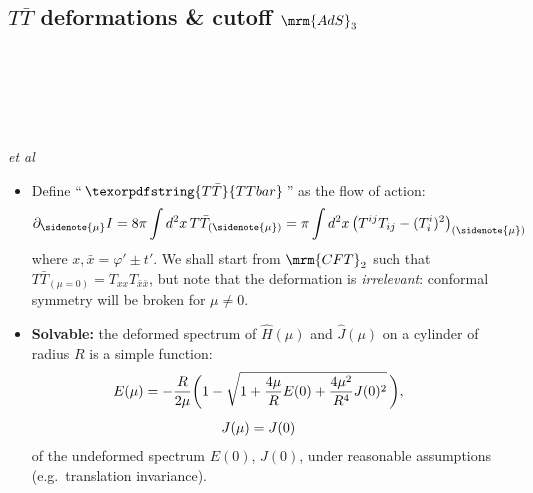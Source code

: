 \documentclass[10pt]{article}
\newcommand{\citations}[1]{{\footnotesize#1\par}}
\newcommand{\TTbar}{\texorpdfstring{\ensuremath{T\bar{T}}}{TTbar}\xspace}
\begin{document}
\begin{multicols}{3}

%
%	





\subsection*{\TTbar deformations \& cutoff $\mrm{AdS}_3$}

\citations{
\textcite{Zamolodchikov:2004ce}\\
\textcite{Dubovsky:2012wk}\\
\textcite{Dubovsky:2013ira}\\
\textcite{Smirnov:2016lqw}\\
\textcite{Cavaglia:2016oda}\\
\textcite{Dubovsky:2017cnj} \textit{et al}
}

\begin{itemize}

\item Define ``\,$\TTbar$\,'' as the flow of action:
\begin{equation}
	\partial_{\sidenote{\mu}} I = {8 \pi} \int d^2x \, T\bar T_{(\sidenote{\mu})} = {\pi} \int d^2x\,\big( T^{ij}T_{ij}- (T^i_i)^2 \big)_{(\sidenote{\mu})}
	\label{TTbardef}
\end{equation}
where $x, \bar{x} = \varphi' \pm t'$.
We shall start from $\mrm{CFT}_2$ such that $T\bar{T}_{(\mu = 0)} = T_{xx} T_{\bar{x}\bar{x}}$, but note that the deformation is \textit{irrelevant}: conformal symmetry will be broken for $\mu \ne 0$.

\item \textbf{Solvable:} the deformed spectrum of $\hat{H}(\mu)$ and $\hat{J}(\mu)$ on a cylinder of radius $R$ is a simple function:
\begin{equation}
\hspace{-2em}
\begin{gathered}
	E(\mu) = - \frac{R }{ 2\mu } \bigg(1-\sqrt{1 + \frac{4\mu}{R} E(0) + \frac{4\mu^2}{R^4} J(0)^2 }
	\,\bigg), \\[1ex] J(\mu)=J(0)
\end{gathered} \label{ttbarspectrum}
\end{equation}
of the undeformed spectrum $E(0)$, $J(0)$,
under reasonable assumptions (e.g.~translation invariance). 


\end{itemize}
\end{multicols}
\end{document}
